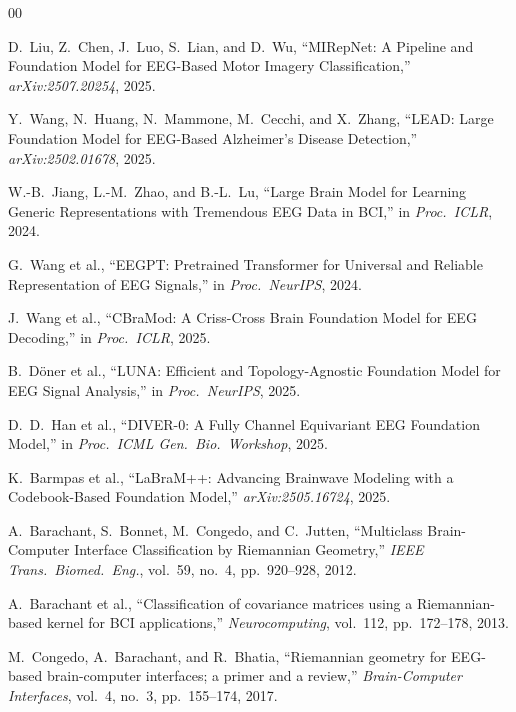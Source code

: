 \documentclass[conference]{IEEEtran}
\begin{document}
\begin{thebibliography}{00}

D.\ Liu, Z.\ Chen, J.\ Luo, S.\ Lian, and D.\ Wu,
``MIRepNet: A Pipeline and Foundation Model for EEG-Based Motor Imagery Classification,''
\textit{arXiv:2507.20254}, 2025.

Y.\ Wang, N.\ Huang, N.\ Mammone, M.\ Cecchi, and X.\ Zhang,
``LEAD: Large Foundation Model for EEG-Based Alzheimer's Disease Detection,''
\textit{arXiv:2502.01678}, 2025.

W.-B.\ Jiang, L.-M.\ Zhao, and B.-L.\ Lu,
``Large Brain Model for Learning Generic Representations with Tremendous EEG Data in BCI,''
in \textit{Proc.\ ICLR}, 2024.

G.\ Wang et al.,
``EEGPT: Pretrained Transformer for Universal and Reliable Representation of EEG Signals,''
in \textit{Proc.\ NeurIPS}, 2024.

J.\ Wang et al.,
``CBraMod: A Criss-Cross Brain Foundation Model for EEG Decoding,''
in \textit{Proc.\ ICLR}, 2025.

B.\ Döner et al.,
``LUNA: Efficient and Topology-Agnostic Foundation Model for EEG Signal Analysis,''
in \textit{Proc.\ NeurIPS}, 2025.

D.\ D.\ Han et al.,
``DIVER-0: A Fully Channel Equivariant EEG Foundation Model,''
in \textit{Proc.\ ICML Gen.\ Bio.\ Workshop}, 2025.

K.\ Barmpas et al.,
``LaBraM++: Advancing Brainwave Modeling with a Codebook-Based Foundation Model,''
\textit{arXiv:2505.16724}, 2025.

A.\ Barachant, S.\ Bonnet, M.\ Congedo, and C.\ Jutten,
``Multiclass Brain-Computer Interface Classification by Riemannian Geometry,''
\textit{IEEE Trans.\ Biomed.\ Eng.}, vol.\ 59, no.\ 4, pp.\ 920--928, 2012.

A.\ Barachant et al.,
``Classification of covariance matrices using a Riemannian-based kernel for BCI applications,''
\textit{Neurocomputing}, vol.\ 112, pp.\ 172--178, 2013.

M.\ Congedo, A.\ Barachant, and R.\ Bhatia,
``Riemannian geometry for EEG-based brain-computer interfaces; a primer and a review,''
\textit{Brain-Computer Interfaces}, vol.\ 4, no.\ 3, pp.\ 155--174, 2017.


\end{thebibliography}
\end{document}
